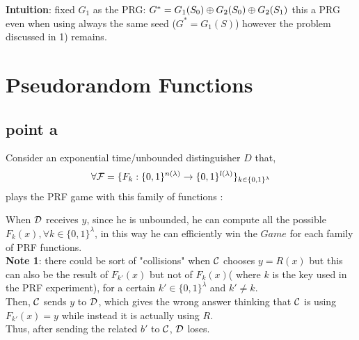 \documentclass[11pt]{article}
\newcounter{t0d0_counter}
\begin{document}
\textbf{Intuition}: fixed $G_1$ as the PRG: $G^*=G_1(S_0)\oplus G_2(S_0)\oplus G_2(S_1)$ this a PRG even when using always the same seed ($G^*=G_1(S)$) however the problem discussed in 1) remains.

\newpage
\section{Pseudorandom Functions}
\subsection{point a}
Consider an exponential time/unbounded distinguisher $D$ that,  
\[
\forall \mathcal{F}=\{ F_{k}:
    \{0,1\}^{n(\lambda)} \to \{0,1\}^{l(\lambda)}\}_{k \in \{0,1\}^{\lambda} }
\]
 plays the PRF game with this family of functions :

\begin{figure}[h!]
   \centering
   \sdinit{}
\end{figure}

When $\mathcal{D}$ receives $y$, since he is unbounded, he can compute all the possible $F_{k}(x), \forall k\in \{0,1\}^{\lambda} $, in this way he can efficiently win the $Game$ for each family of PRF functions.\\

\textbf{Note 1}: there could be sort of  "collisions" when $\mathcal{C}$ chooses $y= R(x)$
but this can also be the result of $F_{k'}(x)$ but not of $F_{k}(x)$( where $k$ is the key used in the PRF experiment), for a certain $k' \in  \{0,1\}^{\lambda} $ and $k'\not= k$.\\ 
Then, $\mathcal{C}$ sends $y$ to $\mathcal{D}$, which gives the wrong answer thinking that $\mathcal{C}$ is using $F_{k'}(x)=y$ while instead it is actually using $R$. \\
Thus, after sending the related $b'$ to $\mathcal{C}$, $\mathcal{D}$ loses.\\
\end{document}
